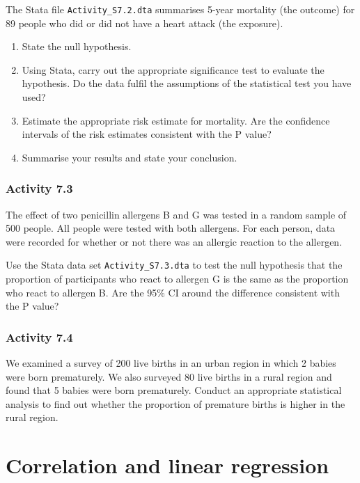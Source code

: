 \documentclass[
]{memoir}
\providecommand{\tightlist}{%
  \setlength{\itemsep}{0pt}\setlength{\parskip}{0pt}}
\begin{document}
The Stata file \texttt{Activity\_S7.2.dta} summarises 5-year mortality (the outcome) for 89 people who did or did not have a heart attack (the exposure).

\begin{enumerate}
\def\labelenumi{\alph{enumi})}
\tightlist
\item
  State the null hypothesis.
\item
  Using Stata, carry out the appropriate significance test to evaluate the hypothesis. Do the data fulfil the assumptions of the statistical test you have used?
\item
  Estimate the appropriate risk estimate for mortality. Are the confidence intervals of the risk estimates consistent with the P value?
\item
  Summarise your results and state your conclusion.
\end{enumerate}

\hypertarget{activity-7.3}{%
\subsection*{Activity 7.3}\label{activity-7.3}}

The effect of two penicillin allergens B and G was tested in a random sample of 500 people. All people were tested with both allergens. For each person, data were recorded for whether or not there was an allergic reaction to the allergen.

Use the Stata data set \texttt{Activity\_S7.3.dta} to test the null hypothesis that the proportion of participants who react to allergen G is the same as the proportion who react to allergen B. Are the 95\% CI around the difference consistent with the P value?

\hypertarget{activity-7.4}{%
\subsection*{Activity 7.4}\label{activity-7.4}}

We examined a survey of 200 live births in an urban region in which 2 babies were born prematurely. We also surveyed 80 live births in a rural region and found that 5 babies were born prematurely. Conduct an appropriate statistical analysis to find out whether the proportion of premature births is higher in the rural region.

\hypertarget{correlation-and-linear-regression}{%
\chapter{Correlation and linear regression}\label{correlation-and-linear-regression}}
\end{document}
